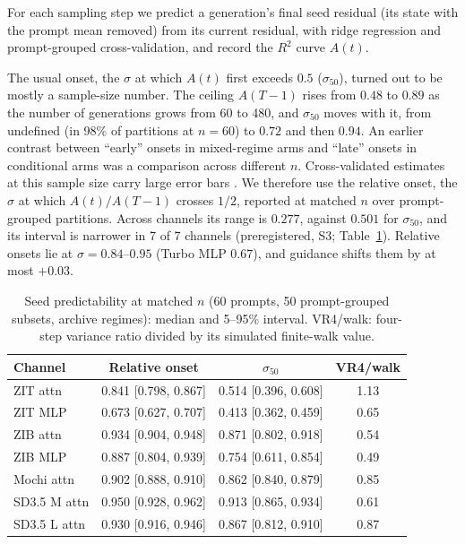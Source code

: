 \documentclass[11pt]{article}
\begin{document}
For each sampling step we predict a generation's final seed residual (its state with the prompt mean removed) from its current residual, with ridge regression and prompt-grouped cross-validation, and record the $R^2$ curve $A(t)$.

The usual onset, the $\sigma$ at which $A(t)$ first exceeds $0.5$ ($\sigma_{50}$), turned out to be mostly a sample-size number. The ceiling $A(T-1)$ rises from $0.48$ to $0.89$ as the number of generations grows from 60 to 480, and $\sigma_{50}$ moves with it, from undefined (in 98\% of partitions at $n=60$) to $0.72$ and then $0.94$. An earlier contrast between ``early'' onsets in mixed-regime arms and ``late'' onsets in conditional arms was a comparison across different $n$. Cross-validated estimates at this sample size carry large error bars \citep{varoquaux2018cross}. We therefore use the relative onset, the $\sigma$ at which $A(t)/A(T-1)$ crosses $1/2$, reported at matched $n$ over prompt-grouped partitions. Across channels its range is $0.277$, against $0.501$ for $\sigma_{50}$, and its interval is narrower in 7 of 7 channels (preregistered, S3; Table~\ref{tab:seed}). Relative onsets lie at $\sigma=0.84$--$0.95$ (Turbo MLP $0.67$), and guidance shifts them by at most $+0.03$.

\begin{table}[h]
\centering\small
\caption{Seed predictability at matched $n$ (60 prompts, 50 prompt-grouped subsets, archive regimes): median and 5--95\% interval. VR4/walk: four-step variance ratio divided by its simulated finite-walk value.}
\label{tab:seed}
\begin{tabular}{lccc}
\toprule
Channel & Relative onset & $\sigma_{50}$ & VR4/walk\\
\midrule
ZIT attn & 0.841 [0.798, 0.867] & 0.514 [0.396, 0.608] & 1.13\\
ZIT MLP & 0.673 [0.627, 0.707] & 0.413 [0.362, 0.459] & 0.65\\
ZIB attn & 0.934 [0.904, 0.948] & 0.871 [0.802, 0.918] & 0.54\\
ZIB MLP & 0.887 [0.804, 0.939] & 0.754 [0.611, 0.854] & 0.49\\
Mochi attn & 0.902 [0.888, 0.910] & 0.862 [0.840, 0.879] & 0.85\\
SD3.5 M attn & 0.950 [0.928, 0.962] & 0.913 [0.865, 0.934] & 0.61\\
SD3.5 L attn & 0.930 [0.916, 0.946] & 0.867 [0.812, 0.910] & 0.87\\
\bottomrule
\end{tabular}
\end{table}
\end{document}
